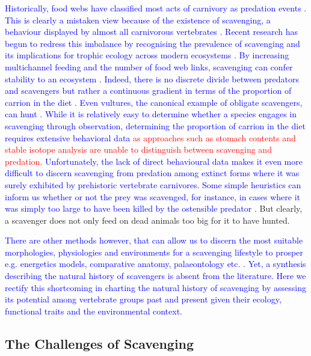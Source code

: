 \documentclass[a4paper,12pt]{article}
\begin{document}
\textcolor{blue}{Historically, food webs have classified most acts of carnivory as predation events \citep{wilson2011scavenging}. 
This is clearly a mistaken view because of the existence of scavenging, a behaviour displayed by almost all carnivorous vertebrates \citep{devault2003scavenging}. 
Recent research has begun to redress this imbalance by recognising the prevalence of scavenging and its implications for trophic ecology across modern ecosystems \citep{pereira2014facultative,periquet2015lion}.
By increasing multichannel feeding and the number of food web links, scavenging can confer stability to an ecosystem \citep{moleon2015living}. 
Indeed, there is no discrete divide between predators and scavengers but rather a continuous gradient in terms of the proportion of carrion in the diet \citep{pereira2014facultative}.
Even vultures, the canonical example of obligate scavengers, can hunt \citep{margalida2011scavenger}. While it is relatively easy to determine whether a species engages in scavenging through observation, determining the proportion of carrion in the diet requires extensive behavioral data \textcolor{red}{as approaches such as stomach contents and stable isotope analysis are unable to distinguish between scavenging and predation.} %
Unfortunately, the lack of direct behavioural data makes it even more difficult to discern scavenging from predation among extinct forms where it was surely exhibited by prehistoric vertebrate carnivores.
Some simple heuristics can inform us whether or not the prey was scavenged, for instance, in cases where it was simply too large to have been killed by the ostensible predator \citep{pobiner2008paleoecological}.}
But clearly, a scavenger does not only feed on dead animals too big for it to have hunted.

\textcolor{blue}{There are other methods however, that can allow us to discern the most suitable morphologies, physiologies and environments for a scavenging lifestyle to prosper e.g. energetics models, comparative anatomy, palaeontology etc. \citep{shipman1986scavenging,ruxton2003could}. 
Yet, a synthesis describing the natural history of scavengers is absent from the literature.
Here we rectify this shortcoming in charting the natural history of scavenging by assessing its potential among vertebrate groups past and present given their ecology, functional traits and the environmental context.}

\subsection{The Challenges of Scavenging} 
\end{document}
